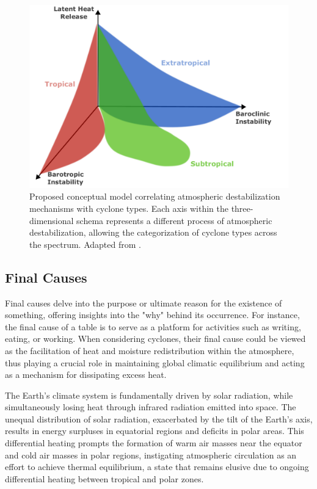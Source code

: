 \begin{figure}[h!]
\begin{center}
\setcaptionmargin{1cm}
\includegraphics[width=0.9\columnwidth,angle=0]{fig/instabilities_cyclones_types.pdf}
\caption[Conceptual Model: Instabilities and Types of Cyclones]{Proposed conceptual model correlating atmospheric destabilization mechanisms with cyclone types. Each axis within the three-dimensional schema represents a different process of atmospheric destabilization, allowing the categorization of cyclone types across the spectrum. Adapted from \citet{silva_dias_catarina_2004}.}
\label{concecputal_view_instabilities}
\end{center}
\end{figure}

\subsection{Final Causes}

Final causes delve into the purpose or ultimate reason for the existence of something, offering insights into the "why" behind its occurrence. For instance, the final cause of a table is to serve as a platform for activities such as writing, eating, or working. When considering cyclones, their final cause could be viewed as the facilitation of heat and moisture redistribution within the atmosphere, thus playing a crucial role in maintaining global climatic equilibrium and acting as a mechanism for dissipating excess heat.

The Earth's climate system is fundamentally driven by solar radiation, while simultaneously losing heat through infrared radiation emitted into space. The unequal distribution of solar radiation, exacerbated by the tilt of the Earth's axis, results in energy surpluses in equatorial regions and deficits in polar areas. This differential heating prompts the formation of warm air masses near the equator and cold air masses in polar regions, instigating atmospheric circulation as an effort to achieve thermal equilibrium, a state that remains elusive due to ongoing differential heating between tropical and polar zones.

